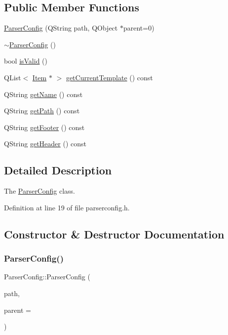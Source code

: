 \subsection*{Public Member Functions}
\begin{DoxyCompactItemize}
\item 
\hyperlink{class_parser_config_a69cccb111fc3b3d4716c92e676f13b9f}{Parser\+Config} (Q\+String path, Q\+Object $\ast$parent=0)
\item 
\hyperlink{class_parser_config_a9a23d768f0a279e163e1f0f49dfc0d9e}{$\sim$\+Parser\+Config} ()
\item 
bool \hyperlink{class_parser_config_a8693076fd02fe0bdad9cab47c31e83cd}{is\+Valid} ()
\item 
Q\+List$<$ \hyperlink{class_item}{Item} $\ast$ $>$ \hyperlink{class_parser_config_a59e44b4b1bc104b9de240cb7640bb63f}{get\+Current\+Template} () const
\item 
Q\+String \hyperlink{class_parser_config_a0a9a65b537b8c7f4041d2b913c46fde7}{get\+Name} () const
\item 
Q\+String \hyperlink{class_parser_config_a9c35e5cd102e56c35a1030b643daed58}{get\+Path} () const
\item 
Q\+String \hyperlink{class_parser_config_ac42d4bcd85b1bb65840a5325926b96d4}{get\+Footer} () const
\item 
Q\+String \hyperlink{class_parser_config_a336cf3ab9bd7c8bc894dcc2b383d3a7b}{get\+Header} () const
\end{DoxyCompactItemize}


\subsection{Detailed Description}
The \hyperlink{class_parser_config}{Parser\+Config} class. 

Definition at line 19 of file parserconfig.\+h.



\subsection{Constructor \& Destructor Documentation}
\mbox{\label{class_parser_config_a69cccb111fc3b3d4716c92e676f13b9f}} 
\subsubsection{\texorpdfstring{Parser\+Config()}{ParserConfig()}}
{\footnotesize\ttfamily Parser\+Config\+::\+Parser\+Config (\begin{DoxyParamCaption}\item[{Q\+String}]{path,  }\item[{Q\+Object $\ast$}]{parent = {} }\end{DoxyParamCaption})}




